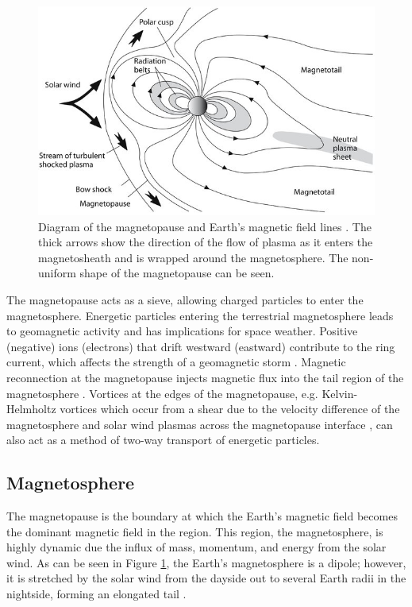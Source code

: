 \begin{figure}
    \centering
    \includegraphics[width=\linewidth]{Figures/The-magnetosphere-is-the-region-where-Earths-magnetic-field-predominates-The_W640.jpg}
    \caption[Diagram of the Earth's magnetopause and magnetic field lines.]{Diagram of the magnetopause and Earth's magnetic field lines \citep{Anderson:2018}. The thick arrows show the direction of the flow of plasma as it enters the magnetosheath and is wrapped around the magnetosphere. The non-uniform shape of the magnetopause can be seen.}
    \label{fig:magnetopause}
\end{figure}

The magnetopause acts as a sieve, allowing charged particles to enter the magnetosphere. Energetic particles entering the terrestrial magnetosphere leads to geomagnetic activity and has implications for space weather. Positive (negative) ions (electrons) that drift westward (eastward) contribute to the ring current, which affects the strength of a geomagnetic storm \citep{Williams:1981}. Magnetic reconnection at the magnetopause injects magnetic flux into the tail region of the magnetosphere \citep{Tsurutani:1990}. Vortices at the edges of the magnetopause, e.g. Kelvin-Helmholtz vortices which occur from a shear due to the velocity difference of the magnetosphere and solar wind plasmas across the magnetopause interface \citep{Nykyri:2001}, can also act as a method of two-way transport of energetic particles.

\subsection{Magnetosphere}
The magnetopause is the boundary at which the Earth's magnetic field becomes the dominant magnetic field in the region. This region, the magnetosphere, is highly dynamic due the influx of mass, momentum, and energy from the solar wind. As can be seen in Figure \ref{fig:magnetopause}, the Earth's magnetosphere is a dipole; however, it is stretched by the solar wind from the dayside out to several Earth radii in the nightside, forming an elongated tail \citep{Borovsky:2018}. %

